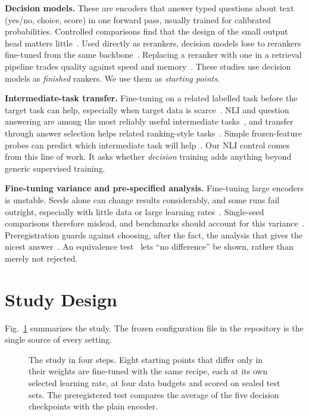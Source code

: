 \documentclass[journal]{IEEEtran}
\begin{document}
\textbf{Decision models.} These are encoders that answer typed questions about text (yes/no, choice, score) in one forward pass, usually trained for calibrated probabilities. Controlled comparisons find that the design of the small output head matters little~\cite{rastogi2026smallheads}. Used directly as rerankers, decision models lose to rerankers fine-tuned from the same backbone~\cite{dinzinger2026systemone}. Replacing a reranker with one in a retrieval pipeline trades quality against speed and memory~\cite{li2026replace}. These studies use decision models as \emph{finished} rankers. We use them as \emph{starting points}.

\textbf{Intermediate-task transfer.} Fine-tuning on a related labelled task before the target task can help, especially when target data is scarce~\cite{phang2018stilts}. NLI and question answering are among the most reliably useful intermediate tasks~\cite{pruksachatkun2020intermediate,vu2020transferability}, and transfer through answer selection helps related ranking-style tasks~\cite{garg2020tanda}. Simple frozen-feature probes can predict which intermediate task will help~\cite{poth2021pretrain,kornblith2019transfer}. Our NLI control comes from this line of work. It asks whether \emph{decision} training adds anything beyond generic supervised training.

\textbf{Fine-tuning variance and pre-specified analysis.} Fine-tuning large encoders is unstable. Seeds alone can change results considerably, and some runs fail outright, especially with little data or large learning rates~\cite{dodge2020finetuning,mosbach2021stability,zhang2021revisiting}. Single-seed comparisons therefore mislead, and benchmarks should account for this variance~\cite{bouthillier2021variance}. Preregistration guards against choosing, after the fact, the analysis that gives the nicest answer~\cite{nosek2018prereg}. An equivalence test~\cite{schuirmann1987tost,lakens2017equivalence} lets ``no difference'' be shown, rather than merely not rejected.

\section{Study Design}
\label{sec:design}

Fig.~\ref{fig:design} summarizes the study. The frozen configuration file in the repository is the single source of every setting.

\begin{figure}[t]
\centering
\resizebox{\textwidth}{!}{}
\caption{The study in four steps. Eight starting points that differ only in their weights are fine-tuned with the same recipe, each at its own selected learning rate, at four data budgets and scored on sealed test sets. The preregistered test compares the average of the five decision checkpoints with the plain encoder.}
\label{fig:design}
\end{figure}
\end{document}
